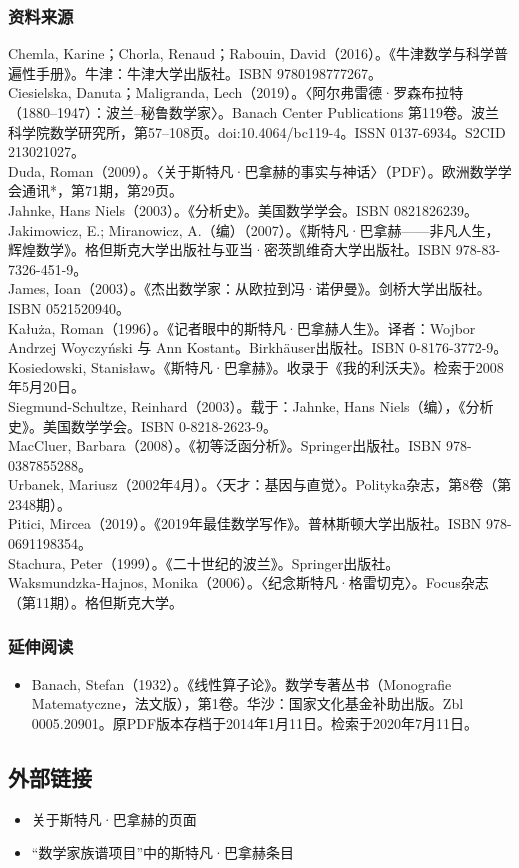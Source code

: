 \subsubsection{资料来源}
Chemla, Karine；Chorla, Renaud；Rabouin, David（2016）。《牛津数学与科学普遍性手册》。牛津：牛津大学出版社。ISBN 9780198777267。\\
Ciesielska, Danuta；Maligranda, Lech（2019）。〈阿尔弗雷德·罗森布拉特（1880–1947）：波兰–秘鲁数学家〉。Banach Center Publications 第119卷。波兰科学院数学研究所，第57–108页。doi:10.4064/bc119-4。ISSN 0137-6934。S2CID 213021027。\\
Duda, Roman（2009）。〈关于斯特凡·巴拿赫的事实与神话〉（PDF）。欧洲数学学会通讯*，第71期，第29页。\\
Jahnke, Hans Niels（2003）。《分析史》。美国数学学会。ISBN 0821826239。\\
Jakimowicz, E.; Miranowicz, A.（编）（2007）。《斯特凡·巴拿赫——非凡人生，辉煌数学》。格但斯克大学出版社与亚当·密茨凯维奇大学出版社。ISBN 978-83-7326-451-9。\\
James, Ioan（2003）。《杰出数学家：从欧拉到冯·诺伊曼》。剑桥大学出版社。ISBN 0521520940。\\
Kałuża, Roman（1996）。《记者眼中的斯特凡·巴拿赫人生》。译者：Wojbor Andrzej Woyczyński 与 Ann Kostant。Birkhäuser出版社。ISBN 0-8176-3772-9。\\
Kosiedowski, Stanisław。《斯特凡·巴拿赫》。收录于《我的利沃夫》。检索于2008年5月20日。\\
Siegmund-Schultze, Reinhard（2003）。载于：Jahnke, Hans Niels（编），《分析史》。美国数学学会。ISBN 0-8218-2623-9。\\
MacCluer, Barbara（2008）。《初等泛函分析》。Springer出版社。ISBN 978-0387855288。\\
Urbanek, Mariusz（2002年4月）。〈天才：基因与直觉〉。Polityka杂志，第8卷（第2348期）。\\
Pitici, Mircea（2019）。《2019年最佳数学写作》。普林斯顿大学出版社。ISBN 978-0691198354。\\
Stachura, Peter（1999）。《二十世纪的波兰》。Springer出版社。\\
Waksmundzka-Hajnos, Monika（2006）。〈纪念斯特凡·格雷切克〉。Focus杂志（第11期）。格但斯克大学。
\subsubsection{延伸阅读}
\begin{itemize}
\item Banach, Stefan（1932）。《线性算子论》。数学专著丛书（Monografie Matematyczne，法文版），第1卷。华沙：国家文化基金补助出版。Zbl 0005.20901。原PDF版本存档于2014年1月11日。检索于2020年7月11日。
\end{itemize}
\subsection{外部链接}
\begin{itemize}
\item 关于斯特凡·巴拿赫的页面
\item “数学家族谱项目”中的斯特凡·巴拿赫条目
\end{itemize}